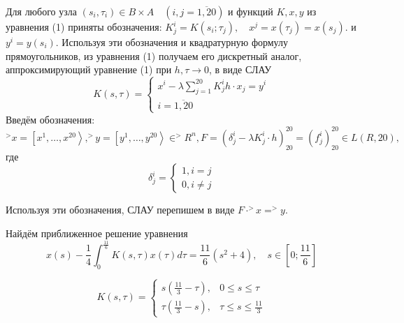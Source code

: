 \documentclass[14pt,a4paper]{scrartcl}
\begin{document}
Для любого узла $(s_i,\tau_i) \in B\times A \quad (i,j = \overline{1,20})$ и функций $K,x,y$ из уравнения
(1) приняты обозначения: $K_{j}^{i}=K(s_{i} ; \tau_{j}), \quad x^{j}=x\left(\tau_{j}\right)=x\left(s_{j}\right).$ и ${y^i = y(s_i)}$. Используя эти обозначения и квадратурную формулу прямоугольников, из уравнения (1) получаем его дискретный аналог, аппроксимирующий уравнение (1) при $h, \tau \rightarrow 0$, в виде СЛАУ 
\begin{equation*}
	K(s, \tau)=\left\{\begin{array}{l}{x^{i}-\lambda \sum_{j=1}^{20} K_{j}^{i} h \cdot x_{j}=y^{i}} \\ {i=\overline{1,20}}\end{array}\right.
\end{equation*}
Введём обозначения:
\begin{equation*}
	^>x=\left[x^{1}, \ldots, x^{20}\right\rangle,^>y=\left[y^{1}, \ldots, y^{20}\right\rangle \in ^>R^{n}, F=\left(\delta_{j}^{i}-\lambda K_{j}^{i} \cdot h\right)_{20}^{20}=\left(f_{j}^{i}\right)_{20}^{20} \in L(R, 20),
\end{equation*}
где
\begin{equation*}
	\delta_{j}^{i}=\left\{\begin{array}{l}{1, i=j} \\ {0, i \neq j}\end{array}\right.
\end{equation*}

Используя эти обозначения, СЛАУ перепишем в виде $F\cdot ^>x = ^>y$.

Найдём приближенное решение уравнения
\begin{equation*}
	x(s)-\frac{1}{4} \int_{0}^{\frac{11}{6}} K(s, \tau) x(\tau) d \tau=\frac{11}{6}\left(s^{2}+4\right), \quad s \in[0 ; \frac{11}{6}]
\end{equation*}

\begin{equation*}
	K(s, \tau)=\left\{\begin{array}{ll}{s(\frac{11}{3}-\tau),} & {0 \leq s \leq \tau} \\ {\tau(\frac{11}{3}-s),} & {\tau \leq s \leq \frac{11}{3}}\end{array}\right.
\end{equation*}
\end{document}
